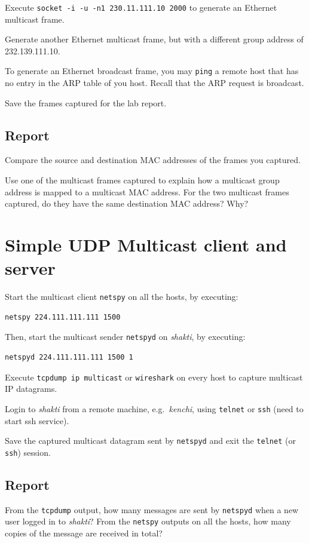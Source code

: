 \documentclass{../UTNetLab}
\begin{document}
    Execute \lstinline{socket -i -u -n1 230.11.111.10 2000} to generate an Ethernet multicast frame.

    Generate another Ethernet multicast frame, but with a different group address of {232.139.111.10}.

    To generate an Ethernet broadcast frame, you may \lstinline{ping} a remote host that has no entry in the ARP table of you host.
    Recall that the ARP request is broadcast.

    Save the frames captured for the lab report.

    \subsection*{Report}
    Compare the source and destination MAC addresses of the frames you captured.

    Use one of the multicast frames captured to explain how a multicast group address is mapped to a multicast MAC address.
    For the two multicast frames captured, do they have the same destination MAC address?
    Why?

\section{Simple UDP Multicast client and server}
    Start the multicast client \lstinline{netspy} on all the hosts, by executing:
    \begin{lstlisting}
netspy 224.111.111.111 1500
    \end{lstlisting}
    Then, start the multicast sender \lstinline{netspyd} on \textit{shakti}, by executing:
    \begin{lstlisting}
netspyd 224.111.111.111 1500 1
    \end{lstlisting}
    Execute \lstinline{tcpdump ip multicast} or \lstinline{wireshark} on every host to capture multicast IP datagrams.

    Login to \textit{shakti} from a remote machine, e.g.\  \textit{kenchi}, using \lstinline{telnet} or \lstinline{ssh} (need to start ssh service).

    Save the captured multicast datagram sent by \lstinline{netspyd} and exit the \lstinline{telnet} (or \lstinline{ssh}) session.

    \subsection*{Report}
    From the \lstinline{tcpdump} output, how many messages are sent by \lstinline{netspyd} when a new user logged in to \textit{shakti}?
    From the \lstinline{netspy} outputs on all the hosts, how many copies of the message are received in total?
\end{document}
